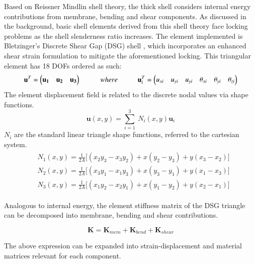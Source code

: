 Based on Reissner Mindlin shell theory, the thick shell considers internal energy contributions from membrane, bending and shear components. As discussed in the background, basic shell elements derived from this shell theory face locking problems as the shell slenderness ratio increases. The element implemented is Bletzinger's Discrete Shear Gap (DSG) shell \cite{Ble00}, which incorporates an enhanced shear strain formulation to mitigate the aforementioned locking. This triangular element has 18 DOFs ordered as such:
\begin{equation} 
\mathbf{u}^T = 
\begin{pmatrix}
\mathbf{u_1} & \mathbf{u_2} & \mathbf{u_3}
\end{pmatrix} 
\hspace{10mm}
where
\hspace{10mm}
\mathbf{u}_i^T = 
\begin{pmatrix}
{u_{xi}} & {u_{yi}} & {u_{yi}} & {\theta_{xi}} & {\theta_{yi}} & {\theta_{zi}}
\end{pmatrix}
\label{eqt1}
\end{equation}
The element displacement field is related to the discrete nodal values via shape functions.
\begin{equation} 
\mathbf{u}(x, y) = \sum_{i=1}^3 \ N_i(x,y) \mathbf{u}_i
\label{eqt2}
\end{equation}
$N_i$ are the standard linear triangle shape functions, referred to the cartesian system.
\begin{gather} 
	\begin{aligned}
		&N_1 (x , y) = \frac{1}{2 A} \big[ (x_2 y_3 - x_3 y_2) + x(y_2 - y_3) + y(x_3 - x_2) \big]
		\\
		&N_2 (x , y) = \frac{1}{2 A} \big[ (x_3 y_1 - x_1 y_3) + x(y_3 - y_1) + y(x_1 - x_3) \big]
		\\
		&N_3 (x , y) = \frac{1}{2 A} \big[ (x_1 y_2 - x_2 y_1) + x(y_1 - y_2) + y(x_2 - x_1) \big]
		\label{eqt3}
	\end{aligned}
\end{gather}

Analogous to internal energy, the element stiffness matrix of the DSG triangle can be decomposed into membrane, bending and shear contributions.

\begin{equation} 
\mathbf{K} = \mathbf{K}_{mem} + \mathbf{K}_{bend} + \mathbf{K}_{shear}
\label{eqt4}
\end{equation}

The above expression can be expanded into strain-displacement and material matrices relevant for each component.


